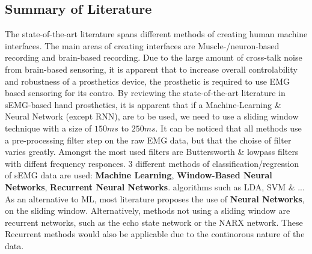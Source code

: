 \documentclass[../main.tex]{subfiles}
\begin{document}


\subsection{Summary of Literature}

The state-of-the-art literature spans different methods of creating human machine interfaces.
The main areas of creating interfaces are Muscle-/neuron-based recording and brain-based recording.
Due to the large amount of cross-talk noise from brain-based sensoring, it is apparent that to increase overall controlability and robustness of a prosthetics device, the prosthetic is required to use EMG based sensoring for its contro.
By reviewing the state-of-the-art literature in sEMG-based hand prosthetics, it is apparent that if a Machine-Learning \& Neural Network (except RNN), are to be used, we need to use a sliding window technique with a size of $150ms$ to $250ms$.
It can be noticed that all methods use a pre-processing filter step on the raw EMG data, but that the choise of filter varies greatly.
Amongst the most used filters are Buttersworth \& lowpass filters with diffent frequency responces.
3 different methods of classification/regression of sEMG data are used: \textbf{Machine Learning}, \textbf{Window-Based Neural Networks}, \textbf{Recurrent Neural Networks}.
algorithms such as LDA, SVM \& ...
As an alternative to ML, most literature proposes the use of \textbf{Neural Networks}, on the sliding window.
Alternatively, methods not using a sliding window are recurrent networks, such as the echo state network or the NARX network.
These Recurrent methods would also be applicable due to the continorous nature of the data.
\end{document}

